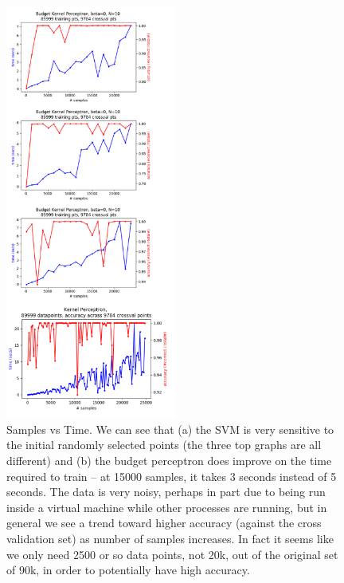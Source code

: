 \documentclass[submit]{harvardml}
\newenvironment{answer}{%
    \color{answergreen}\bf}
  {%
  }
\begin{document}
\begin{enumerate}
\begin{answer}
            \begin{figure}[H]
                \centering
                \includegraphics[width=0.5\textwidth]{samplesvstime.png}
                \caption{Samples vs Time. We can see that (a) the SVM is very sensitive to the
                initial randomly selected points (the three top graphs are all different) and (b)
            the budget perceptron does improve on the time required to train -- at 15000 samples, it
        takes 3 seconds instead of 5 seconds. The data is very noisy, perhaps in part due to being
    run inside a virtual machine while other processes are running, but in general we see a trend
toward higher accuracy (against the cross validation set) as number of samples increases. In fact it
seems like we only need 2500 or so data points, not 20k, out of the original set of 90k, in order to
potentially have high accuracy.}
                \label{Problem 1, part 1.}
            \end{figure}


\end{answer}
\end{enumerate}
\end{document}
